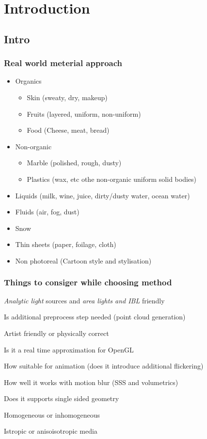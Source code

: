 \chapter{Introduction}
\label{chapter:Introduction}

\section{Intro}
\subsection{Real world meterial approach}
\begin{itemize}
    \item Organics
    \begin{itemize}
      \item Skin (sweaty, dry, makeup)
      \item Fruits (layered, uniform, non-uniform)
      \item Food (Cheese, meat, bread)
    \end{itemize}
    \item Non-organic
    \begin{itemize}
      \item Marble (polished, rough, dusty)
      \item Plastics (wax, etc othe non-organic uniform solid bodies)
    \end{itemize}
    \item Liquids (milk, wine, juice, dirty/dusty water, ocean water)
    \item Fluids (air, fog, dust)
    \item Snow
    \item Thin sheets (paper, foilage, cloth)
    \item Non photoreal (Cartoon style and stylisation)
\end{itemize}

\subsection{Things to consiger while choosing method}
\begin{description}
  \item [Lighting restrictions] \emph{Analytic light} sources and \emph{area lights and IBL} friendly
  \item [Multiple object friendly]
  \item [Preprocess] Is additional preprocess step needed (point cloud generation)
  \item [Parametrization] Artist friendly or physically correct
  \item [Performance] Is it a real time approximation for OpenGL
  \item [Flickering] How suitable for animation (does it introduce additional flickering)
  \item [Motion blur] How well it works with motion blur (SSS and volumetrics)
  \item [Closed objecs only] Does it supports single sided geometry
  \item Homogeneous or inhomogeneous
  \item Istropic or anisoisotropic media
\end{description}